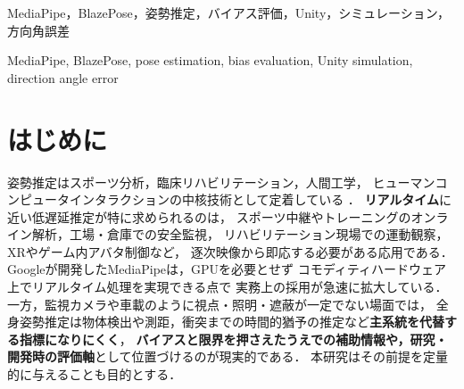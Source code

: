 \documentclass[fleqn]{ieej}
\begin{document}
\begin{abstract}
\medskip
\noindent\textbf{Abstract:}\quad
This study quantifies systematic biases in MediaPipe pose estimation using
ground truth from a Unity simulation with 505 multi-view cameras on four
height layers.
The GT is synthetic; the reported statistics therefore describe estimator
behaviour under these reproducible conditions, and generalisation to real
subjects and in-the-wild video requires independent validation.
The results support \emph{ancillary, research-oriented} use of pose outputs
once biases and estimator limits are acknowledged; they are not a drop-in
replacement for safety-critical pipelines (e.g.\ detection, ranging, time-to-contact).
Whereas prior evaluations emphasise single-number accuracy under limited
viewpoint conditions, we identify structured error patterns arising from model
architecture, training-data priors, and coordinate conventions.
We collected 259{,}356 joint observations (107 frames $\times$ 505 cameras
$\times$ 12 joints) and analysed joint-angle MAE and direction-angle errors
($\Delta\theta$, $\Delta\psi$).
Four systematic biases are identified and linked to primary evidence:
coordinate-system bias mitigated by $y \leftarrow -y$
(Table~\ref{tab:yflip_effect}); a pelvic rotation artefact from
anti-correlated hip $\Delta\psi$ ($r=-0.84$); upper-limb coupling in
$\Delta\psi$ ($r=0.72$--$0.77$); and viewpoint-dependent MAE increasing at
overhead cameras, consistent with a frontal prior in training data
(Table~\ref{tab:mae_by_layer}, Figure~\ref{fig:mae_layer_compare}).
\end{abstract}
\begin{jkeyword}
MediaPipe，BlazePose，姿勢推定，バイアス評価，Unity，シミュレーション，方向角誤差
\end{jkeyword}
\begin{ekeyword}
MediaPipe, BlazePose, pose estimation, bias evaluation, Unity simulation, direction angle error
\end{ekeyword}
\maketitle
\section{はじめに}

姿勢推定はスポーツ分析，臨床リハビリテーション，人間工学，
ヒューマンコンピュータインタラクションの中核技術として定着している
\cite{mediapipe,blazepose}．
\textbf{リアルタイム}に近い低遅延推定が特に求められるのは，
スポーツ中継やトレーニングのオンライン解析，工場・倉庫での安全監視，
リハビリテーション現場での運動観察，XRやゲーム内アバタ制御など，
逐次映像から即応する必要がある応用である．
Googleが開発したMediaPipeは，GPUを必要とせず
コモディティハードウェア上でリアルタイム処理を実現できる点で
実務上の採用が急速に拡大している\cite{mediapipe}．
一方，監視カメラや車載のように視点・照明・遮蔽が一定でない場面では，
全身姿勢推定は物体検出や測距，衝突までの時間的猶予の推定など\textbf{主系統を代替する指標になりにくく}，
\textbf{バイアスと限界を押さえたうえでの補助情報や，研究・開発時の評価軸}として位置づけるのが現実的である．
本研究はその前提を定量的に与えることも目的とする．
\end{document}
